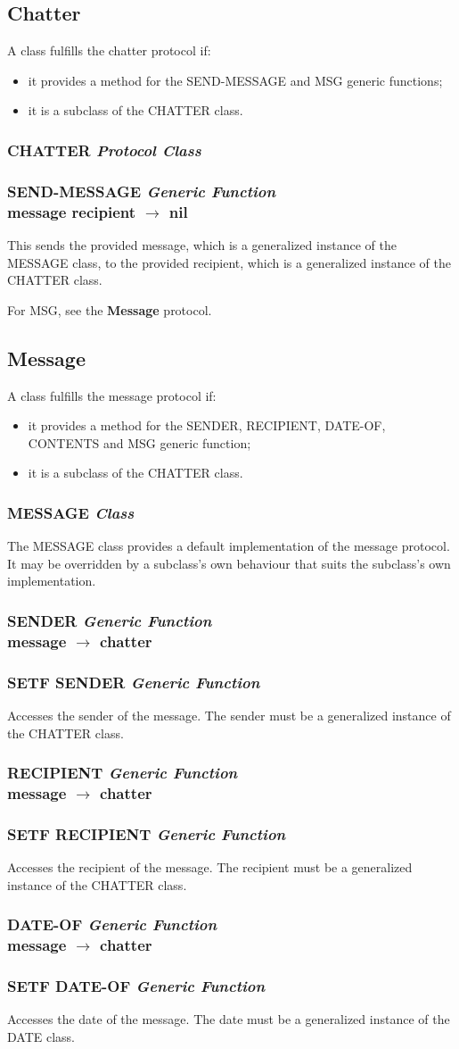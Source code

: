 \documentclass[10pt]{extarticle}
\newcommand{\genericentry}[4] {\setstretch{0.7}
                               \vspace{-0.5em} \subsubsection{{\btt #1} \hfill {\it #2} \\
                               {\vspace{0.0em} \hspace{0.2cm} \scriptsize \ttfamily #3 $\rightarrow$ #4}}
                               \setstretch{1.0}}
\newcommand{\classentry}[2] {\subsubsection{{\btt #1} \hfill {\it #2}}}
\begin{document}
\subsection{Chatter}
A class fulfills the chatter protocol if:
\begin{itemize}[noitemsep]
\item it provides a method for the {\btt SEND-MESSAGE} and {\btt MSG} generic functions;
\item it is a subclass of the {\btt CHATTER} class.
\end{itemize}
\classentry{CHATTER}{Protocol Class}
\genericentry{SEND-MESSAGE}{Generic Function}{message recipient}{nil}
This sends the provided message, which is a generalized instance of the {\btt MESSAGE} class, to the provided recipient, which is a generalized instance of the {\btt CHATTER} class. \par
For {\btt MSG}, see the {\bf Message} protocol.





\subsection{Message}
A class fulfills the message protocol if:
\begin{itemize}[noitemsep]
\item it provides a method for the {\btt SENDER}, {\btt RECIPIENT}, {\btt DATE-OF}, {\btt CONTENTS} and {\btt MSG} generic function;
\item it is a subclass of the {\btt CHATTER} class.
\end{itemize}
\classentry{MESSAGE}{Class}
The MESSAGE class provides a default implementation of the message protocol. It may be overridden by a subclass's own behaviour that suits the subclass's own implementation.

\genericentry{SENDER}{Generic Function}{message}{chatter}
\classentry{SETF SENDER}{Generic Function}
Accesses the sender of the {\btt message}. The sender must be a generalized instance of the {\btt CHATTER} class.

\genericentry{RECIPIENT}{Generic Function}{message}{chatter}
\classentry{SETF RECIPIENT}{Generic Function}
Accesses the recipient of the {\btt message}. The recipient must be a generalized instance of the {\btt CHATTER} class.

\genericentry{DATE-OF}{Generic Function}{message}{chatter}
\classentry{SETF DATE-OF}{Generic Function}
Accesses the date of the {\btt message}. The date must be a generalized instance of the {\btt DATE} class.
\end{document}
